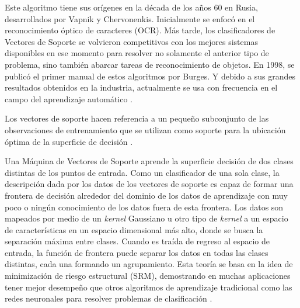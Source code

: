 \begin{itemize}
	Este algoritmo tiene sus orígenes en la década de los años 60 en Rusia, desarrollados por Vapnik y Chervonenkis. Inicialmente se enfocó en el reconocimiento óptico de caracteres (OCR). Más tarde, los clasificadores de Vectores de Soporte se volvieron competitivos con los mejores sistemas disponibles en ese momento para resolver no solamente el anterior tipo de problema, sino también abarcar tareas de reconocimiento de objetos. En 1998, se publicó el primer manual de estos algoritmos por Burges. Y debido a sus grandes resultados obtenidos en la industria, actualmente se usa con frecuencia en el campo del aprendizaje automático \parencite{tec_smola2004svm}.
	
	Los vectores de soporte hacen referencia a un pequeño subconjunto de las observaciones de entrenamiento que se utilizan como soporte para la ubicación óptima de la superficie de decisión \parencite{gl_mathworks_svm}.
	
	Una Máquina de Vectores de Soporte aprende la superficie decisión de dos clases distintas de los puntos de entrada. Como un clasificador de una sola clase, la descripción dada por los datos de los vectores de soporte es capaz de formar una frontera de decisión alrededor del dominio de los datos de aprendizaje con muy poco o ningún conocimiento de los datos fuera de esta frontera. Los datos son mapeados por medio de un \textit{kernel} Gaussiano u otro tipo de \textit{kernel} a un espacio de características en un espacio dimensional más alto, donde se busca la separación máxima entre clases. Cuando es traída de regreso al espacio de entrada, la función de frontera puede separar los datos en todas las clases distintas, cada una formando un agrupamiento. Esta teoría se basa en la idea de minimización de riesgo estructural (SRM), demostrando en muchas aplicaciones tener mejor desempeño que otros algoritmos de aprendizaje tradicional como las redes neuronales para resolver problemas de clasificación \parencite{tec_betancourt2005svm}.
	

\end{itemize}
